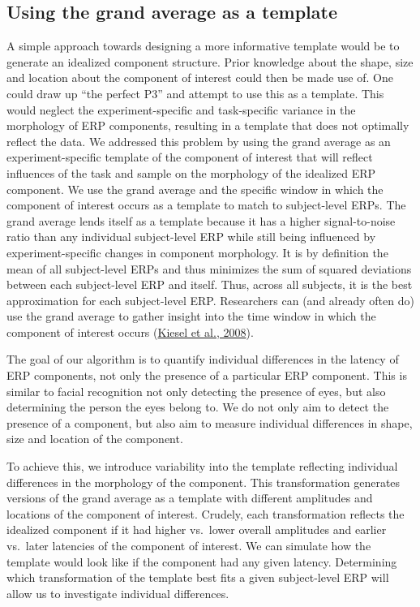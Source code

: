\documentclass[
  man]{apa7}
\begin{document}
\hypertarget{using-the-grand-average-as-a-template}{%
\subsection{Using the grand average as a template}\label{using-the-grand-average-as-a-template}}

A simple approach towards designing a more informative template would be to generate an idealized component structure. Prior knowledge about the shape, size and location about the component of interest could then be made use of. One could draw up ``the perfect P3'' and attempt to use this as a template. This would neglect the experiment-specific and task-specific variance in the morphology of ERP components, resulting in a template that does not optimally reflect the data. We addressed this problem by using the grand average as an experiment-specific template of the component of interest that will reflect influences of the task and sample on the morphology of the idealized ERP component. We use the grand average and the specific window in which the component of interest occurs as a template to match to subject-level ERPs. The grand average lends itself as a template because it has a higher signal-to-noise ratio than any individual subject-level ERP while still being influenced by experiment-specific changes in component morphology. It is by definition the mean of all subject-level ERPs and thus minimizes the sum of squared deviations between each subject-level ERP and itself. Thus, across all subjects, it is the best approximation for each subject-level ERP. Researchers can (and already often do) use the grand average to gather insight into the time window in which the component of interest occurs (\protect\hyperlink{ref-kiesel2008measurement}{Kiesel et al., 2008}).

The goal of our algorithm is to quantify individual differences in the latency of ERP components, not only the presence of a particular ERP component. This is similar to facial recognition not only detecting the presence of eyes, but also determining the person the eyes belong to. We do not only aim to detect the presence of a component, but also aim to measure individual differences in shape, size and location of the component.

To achieve this, we introduce variability into the template reflecting individual differences in the morphology of the component. This transformation generates versions of the grand average as a template with different amplitudes and locations of the component of interest. Crudely, each transformation reflects the idealized component if it had higher vs.~lower overall amplitudes and earlier vs.~later latencies of the component of interest. We can simulate how the template would look like if the component had any given latency. Determining which transformation of the template best fits a given subject-level ERP will allow us to investigate individual differences.
\end{document}
